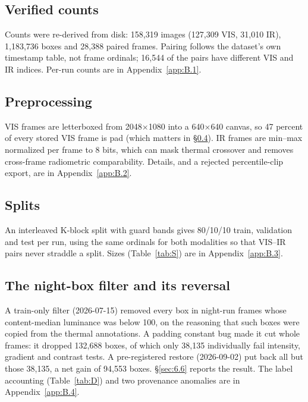 \documentclass[10pt]{article}
\begin{document}
\subsection{Verified counts}\label{sec:3.2}
Counts were re-derived from disk: 158,319 images (127,309 VIS, 31,010 IR), 1,183,736 boxes and 28,388 paired frames. Pairing follows the dataset's own timestamp table, not frame ordinals; 16,544 of the pairs have different VIS and IR indices. Per-run counts are in Appendix~\ref{app:B.1}.

\subsection{Preprocessing}\label{sec:3.3}
VIS frames are letterboxed from 2048$\times$1080 into a 640$\times$640 canvas, so 47 percent of every stored VIS frame is pad (which matters in \S\ref{sec:3.5}). IR frames are min--max normalized per frame to 8 bits, which can mask thermal crossover and removes cross-frame radiometric comparability. Details, and a rejected percentile-clip export, are in Appendix~\ref{app:B.2}.

\subsection{Splits}\label{sec:3.4}
An interleaved K-block split with guard bands gives 80/10/10 train, validation and test per run, using the same ordinals for both modalities so that VIS--IR pairs never straddle a split. Sizes (Table~\ref{tab:S}) are in Appendix~\ref{app:B.3}.

\subsection{The night-box filter and its reversal}\label{sec:3.5}
A train-only filter (2026-07-15) removed every box in night-run frames whose content-median luminance was below 100, on the reasoning that such boxes were copied from the thermal annotations. A padding constant bug made it cut whole frames: it dropped 132,688 boxes, of which only 38,135 individually fail intensity, gradient and contrast tests. A pre-registered restore (2026-09-02) put back all but those 38,135, a net gain of 94,553 boxes. \S\ref{sec:6.6} reports the result. The label accounting (Table~\ref{tab:D}) and two provenance anomalies are in Appendix~\ref{app:B.4}.
\end{document}
